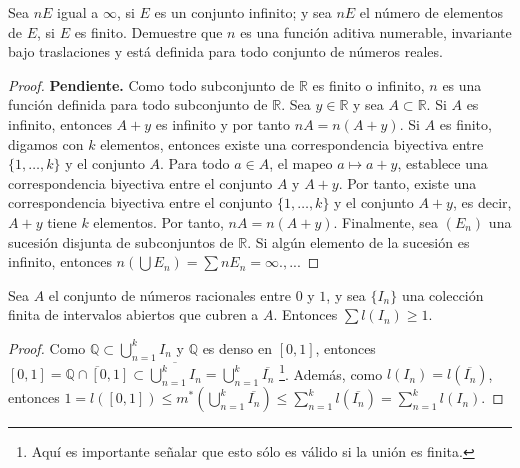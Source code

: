 \documentclass[12pt]{article}
\newcommand{\Q}{\mathbb{Q}}
\newcommand{\R}{\mathbb{R}}
\newenvironment{problem}[2][Problema]{\begin{trivlist}
\item[\hskip \labelsep {\bfseries #1}\hskip \labelsep {\bfseries #2.}]}{\end{trivlist}}
\begin{document}
\begin{problem}{4}
Sea $n E$ igual a $\infty$,  si $E$ es un conjunto infinito; y sea $n E$ el número de elementos de $E$, si $E$ es finito. Demuestre que $n$ es una función aditiva numerable, invariante bajo traslaciones y está definida para todo conjunto de números reales. 
\end{problem}

\begin{proof} \textbf{Pendiente. }
Como todo subconjunto de $\R$ es finito o infinito, $n$ es una función definida para todo subconjunto de $\R$. Sea $y \in \R$ y sea $A \subset \R$. Si $A$ es infinito, entonces $A + y$ es infinito y por tanto $n A = n (A + y).$ Si $A$ es finito, digamos con $k$ elementos, entonces existe una correspondencia biyectiva entre $\{1, \ldots, k \}$ y el conjunto $A$. Para todo $a \in A$, el mapeo $a \mapsto a + y$, establece una correspondencia biyectiva entre el conjunto $A$ y $A + y$. Por tanto, existe una correspondencia biyectiva entre el conjunto  $\{1, \ldots, k \}$ y el conjunto $A + y $, es decir, $A + y$ tiene $k$ elementos. Por tanto, $n A = n (A + y).$ Finalmente, sea $(E_n)$ una sucesión disjunta de subconjuntos de $\R$.  Si algún elemento de la sucesión es infinito, entonces $n(\bigcup E_n) = \sum n E_n = \infty.,...$ 

\end{proof}


\begin{problem}{5}
Sea $A$ el conjunto de números racionales entre $0$ y $1$, y sea $\{I_n\}$ una colección finita de intervalos abiertos que cubren a $A$. Entonces $\sum l(I_n) \geq 1.$
\end{problem}


\begin{proof}
Como  $\Q \subset \bigcup_{n=1}^{k} I_n$ y $\Q$ es denso en $[0, 1]$, entonces $[0, 1] = \overline{\Q \cap [0, 1]} \subset \overline{\bigcup_{n=1}^{k} I_n} = \bigcup_{n=1}^{k} \overline{I_n}$ \footnote[2]{Aquí es importante señalar que esto sólo es válido si la unión es finita.}. Además, como $l(I_n) = l(\overline{I_n})$, entonces $1 = l([0, 1]) \leq m^*(\bigcup_{n=1}^{k} \overline{I_n}) \leq \sum_{n=1}^k l(\overline{I_n}) = \sum_{n=1}^k l(I_n)$.

\end{proof}
\end{document}

